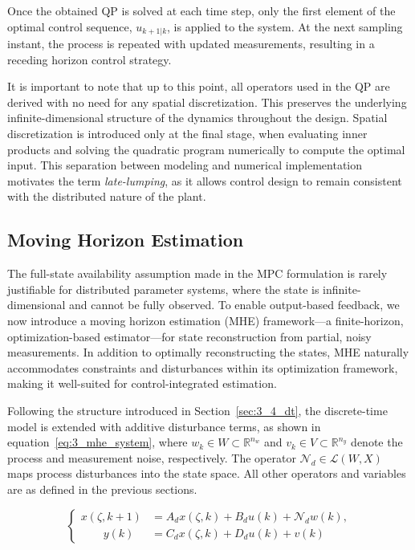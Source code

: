 Once the obtained QP is solved at each time step, only the first element of the optimal control sequence, $u_{k+1|k}$, is applied to the system. At the next sampling instant, the process is repeated with updated measurements, resulting in a receding horizon control strategy.

It is important to note that up to this point, all operators used in the QP are derived with no need for any spatial discretization. This preserves the underlying infinite-dimensional structure of the dynamics throughout the design. Spatial discretization is introduced only at the final stage, when evaluating inner products and solving the quadratic program numerically to compute the optimal input. This separation between modeling and numerical implementation motivates the term \emph{late-lumping}, as it allows control design to remain consistent with the distributed nature of the plant.


\subsection{Moving Horizon Estimation} \label{sec:3_mhe}

The full-state availability assumption made in the MPC formulation is rarely justifiable for distributed parameter systems, where the state is infinite-dimensional and cannot be fully observed. To enable output-based feedback, we now introduce a moving horizon estimation (MHE) framework---a finite-horizon, optimization-based estimator---for state reconstruction from partial, noisy measurements. In addition to optimally reconstructing the states, MHE naturally accommodates constraints and disturbances within its optimization framework, making it well-suited for control-integrated estimation.

Following the structure introduced in Section~\ref{sec:3_4_dt}, the discrete-time model is extended with additive disturbance terms, as shown in equation~\eqref{eq:3_mhe_system}, where $w_k \in W \subset \mathbb{R}^{n_w}$ and $v_k \in V \subset \mathbb{R}^{n_y}$ denote the process and measurement noise, respectively. The operator $\mathcal{N}_d \in \mathcal{L}(W, X)$ maps process disturbances into the state space. All other operators and variables are as defined in the previous sections.

\begin{equation} \label{eq:3_mhe_system}
\begin{cases}
x(\zeta, k{+}1) &= A_d x(\zeta, k) + B_d u(k) + \mathcal{N}_d w(k), \\
\qquad y(k) &= C_d x(\zeta, k) + D_d u(k) + v(k)
\end{cases}
\end{equation}

